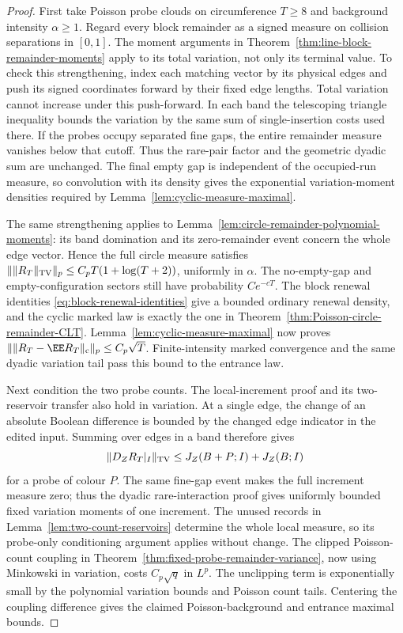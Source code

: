 \documentclass[11pt,letterpaper]{article}
\begin{document}
\begin{proof}
First take Poisson probe clouds on circumference $T\ge8$
and background intensity $\alpha\ge1$. Regard every block
remainder as a signed measure on collision separations in $[0,1]$.
The moment arguments in
Theorem~\ref{thm:line-block-remainder-moments} apply to its
total variation, not only its terminal value.
To check this strengthening, index each matching vector by
its physical edges and push its signed coordinates forward
by their fixed edge lengths. Total variation cannot increase
under this push-forward. In each band the telescoping
triangle inequality bounds the variation by the same sum
of single-insertion costs used there. If the probes occupy
separated fine gaps, the entire remainder measure vanishes
below that cutoff. Thus the rare-pair factor and the
geometric dyadic sum are unchanged.
The final empty gap is independent of the occupied-run
measure, so convolution with its density gives the exponential
variation-moment densities required by
Lemma~\ref{lem:cyclic-measure-maximal}.

The same strengthening applies to
Lemma~\ref{lem:circle-remainder-polynomial-moments}:
its band domination and its zero-remainder event concern
the whole edge vector. Hence the full circle measure satisfies
$\|\|R_T\|_{\rm TV}\|_p\le C_pT(1+\log(T+2))$, uniformly in
$\alpha$. The no-empty-gap and empty-configuration sectors
still have probability $Ce^{-cT}$.
The block renewal identities \eqref{eq:block-renewal-identities}
give a bounded ordinary renewal density, and the cyclic
marked law is exactly the one in
Theorem~\ref{thm:Poisson-circle-remainder-CLT}.
Lemma~\ref{lem:cyclic-measure-maximal} now proves
$\|\|R_T-\EE R_T\|_{\rm c}\|_p\le C_p\sqrt T$.
Finite-intensity marked convergence and the same dyadic
variation tail pass this bound to the entrance law.

Next condition the two probe counts. The local-increment
proof and its two-reservoir transfer also hold in variation.
At a single edge, the change of an absolute Boolean difference
is bounded by the changed edge indicator in the edited input.
Summing over edges in a band therefore gives
\[
 \|D_ZR_T|_I\|_{\rm TV}
       \le J_Z(B+P;I)+J_Z(B;I)
\]
for a probe of colour $P$.
The same fine-gap event makes the full increment measure
zero; thus the dyadic rare-interaction proof gives uniformly
bounded fixed variation moments of one increment.
The unused records in Lemma~\ref{lem:two-count-reservoirs}
determine the whole local measure, so its probe-only
conditioning argument applies without change.
The clipped Poisson-count coupling in
Theorem~\ref{thm:fixed-probe-remainder-variance}, now using
Minkowski in variation, costs $C_p\sqrt q$ in $L^p$.
The unclipping term is exponentially small by the polynomial
variation bounds and Poisson count tails.
Centering the coupling difference gives the claimed
Poisson-background and entrance maximal bounds.


\end{proof}
\end{document}
